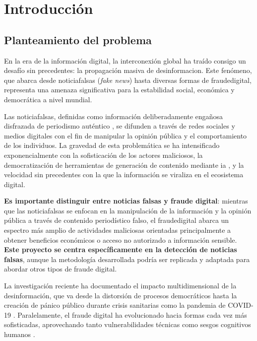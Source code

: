 \chapter{Introducción \label{cap:Introduccion}}

\section{Planteamiento del problema}

En la era de la información digital, la interconexión global ha traído consigo un desafío sin precedentes: la propagación masiva de \gls{desinformacion}. Este fenómeno, que abarca desde \glspl{noticiafalsa} (\textit{fake news}) hasta diversas formas de \gls{fraudedigital}, representa una amenaza significativa para la estabilidad social, económica y democrática a nivel mundial.

Las \glspl{noticiafalsa}, definidas como información deliberadamente engañosa disfrazada de periodismo auténtico \cite{bondielli2019survey}, se difunden a través de redes sociales y medios digitales con el fin de manipular la opinión pública y el comportamiento de los individuos. La gravedad de esta problemática se ha intensificado exponencialmente con la sofisticación de los actores maliciosos, la democratización de herramientas de generación de contenido mediante \gls{ia} \cite{hu2024bad}, y la velocidad sin precedentes con la que la información se viraliza en el ecosistema digital.

\textbf{Es importante distinguir entre noticias falsas y fraude digital}: mientras que las \glspl{noticiafalsa} se enfocan en la manipulación de la información y la opinión pública a través de contenido periodístico falso, el \gls{fraudedigital} abarca un espectro más amplio de actividades maliciosas orientadas principalmente a obtener beneficios económicos o acceso no autorizado a información sensible. \textbf{Este proyecto se centra específicamente en la detección de noticias falsas}, aunque la metodología desarrollada podría ser replicada y adaptada para abordar otros tipos de fraude digital.

La investigación reciente ha documentado el impacto multidimensional de la desinformación, que va desde la distorsión de procesos democráticos \cite{ali2020posttruth} hasta la creación de pánico público durante crisis sanitarias como la pandemia de COVID-19 \cite{perez2020fake}. Paralelamente, el fraude digital ha evolucionado hacia formas cada vez más sofisticadas, aprovechando tanto vulnerabilidades técnicas como sesgos cognitivos humanos \cite{ali2021fake}.

